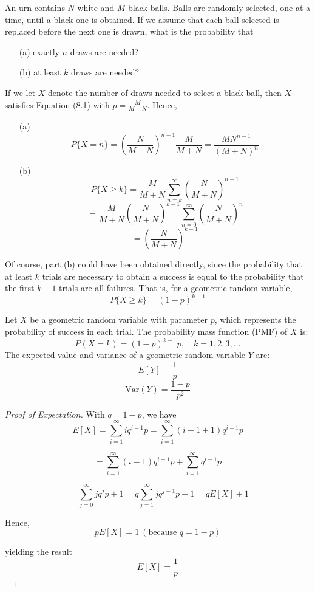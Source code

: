 \begin{example}
    An urn contains \( N \) white and \( M \) black balls. Balls are randomly selected, one at a time, until a black one is obtained. If we assume that each ball selected is replaced before the next one is drawn, what is the probability that
\begin{enumerate}
    \item[(a)] exactly \( n \) draws are needed?
    \item[(b)] at least \( k \) draws are needed?
\end{enumerate}
\begin{solution}
 If we let \( X \) denote the number of draws needed to select a black ball, then \( X \) satisfies Equation (8.1) with \( p = \frac{M}{M + N} \). Hence,
\begin{enumerate}
    \item[(a)]
    \[
    P\{X = n\} = \left( \frac{N}{M + N} \right)^{n-1} \frac{M}{M + N} = \frac{M N^{n-1}}{(M + N)^n}
    \]
    \item[(b)]
    \[
    P\{X \geq k\} = \frac{M}{M + N} \sum_{n=k}^{\infty} \left( \frac{N}{M + N} \right)^{n-1}
    \]
    \[
    = \frac{M}{M + N} \left( \frac{N}{M + N} \right)^{k-1} \sum_{n=0}^{\infty} \left( \frac{N}{M + N} \right)^n
    \]
    \[
    = \left( \frac{N}{M + N} \right)^{k-1}
    \]
\end{enumerate}

Of course, part (b) could have been obtained directly, since the probability that at least \( k \) trials are necessary to obtain a success is equal to the probability that the first \( k - 1 \) trials are all failures. That is, for a geometric random variable,
\[
P\{X \geq k\} = (1 - p)^{k-1}
\]
\end{solution}
\end{example}

\begin{theorem}
Let \( X \) be a geometric random variable with parameter \( p \), which represents the probability of success in each trial. The probability mass function (PMF) of \( X \) is:
\[
P(X = k) = (1 - p)^{k-1} p, \quad k = 1, 2, 3, \ldots
\]
    The expected value and variance of a geometric random variable \( Y \) are:
\begin{equation}
    E[Y] = \frac{1}{p}
\end{equation}
\begin{equation}
    \text{Var}(Y) = \frac{1 - p}{p^2}
\end{equation}
\end{theorem}
\begin{proof}[Proof of Expectation]
With \( q = 1 - p \), we have
\[
E[X] = \sum_{i=1}^{\infty} i q^{i-1} p= \sum_{i=1}^{\infty} (i - 1 + 1) q^{i-1} p
\]

\[
= \sum_{i=1}^{\infty} (i - 1) q^{i-1} p + \sum_{i=1}^{\infty} q^{i-1} p
\]

\[
= \sum_{j=0}^{\infty} j q^j p + 1= q \sum_{j=1}^{\infty} j q^{j-1} p + 1= q E[X] + 1
\]

Hence,
\[
p E[X] = 1 \ (\text{because }q = 1-p)
\]

yielding the result
\[
E[X] = \frac{1}{p}
\]
\end{proof}

